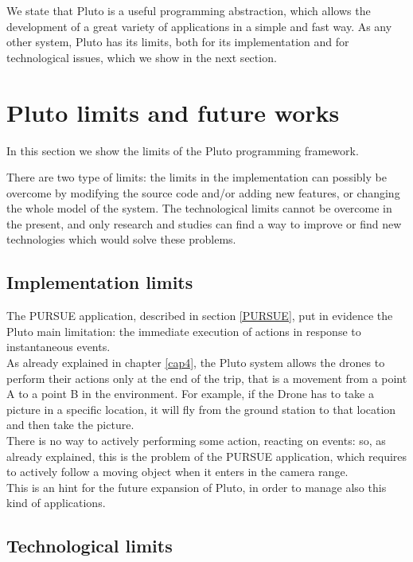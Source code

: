We state that Pluto is a useful programming abstraction, which allows the development of a great variety of applications in a simple and fast way.
As any other system, Pluto has its limits, both for its implementation and for technological issues, which we show in the next section.

\newpage

\section{Pluto limits and future works}

In this section we show the limits of the Pluto programming framework.

There are two type of limits:
the limits in the implementation can possibly be overcome by modifying the source code and/or adding new features, or changing the whole model of the system.
The technological limits cannot be overcome in the present, and only research and studies can find a way to improve or find new technologies which would solve these problems.


\subsection{Implementation limits}

The PURSUE application, described in section \ref{PURSUE}, put in evidence the Pluto main limitation: the immediate execution of actions in response to instantaneous events.
\\

As already explained in chapter \ref{cap4}, the Pluto system allows the drones to perform their actions only at the end of the trip, that is a movement from a point A to a point B in the environment.
For example, if the Drone has to take a picture in a specific location, it will fly from the ground station to that location and then take the picture.
\\

There is no way to actively performing some action, reacting on events:
so, as already explained, this is the problem of the PURSUE application, which requires to actively follow a moving object when it enters in the camera range.
\\

This is an hint for the future expansion of Pluto, in order to manage also this kind of applications.

\subsection{Technological limits}

